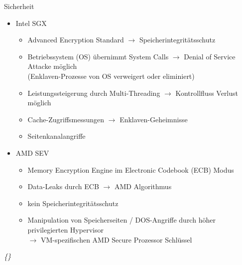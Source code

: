 \documentclass{sdqbeamer}
\begin{document}
\begin{frame}{Sicherheit}
	\begin{itemize}
		\item Intel SGX
		\begin{itemize}
			\item Advanced Encryption Standard
				\(\rightarrow\) Speicherintegritätsschutz
			\item Betriebssystem (OS) übernimmt System Calls
				\(\rightarrow\) Denial of Service Attacke möglich\\
				(Enklaven-Prozesse von OS verweigert oder eliminiert)
			\item Leistungssteigerung durch Multi-Threading
				\(\rightarrow\) Kontrollfluss Verlust möglich
			\item Cache-Zugriffsmessungen \(\rightarrow\) Enklaven-Geheimnisse
			\item Seitenkanalangriffe
		\end{itemize}
		\item AMD SEV
		\begin{itemize}
			\item Memory Encryption Engine im Electronic Codebook (ECB) Modus 
			\item Data-Leaks durch ECB \(\rightarrow\) AMD Algorithmus 
			\item kein Speicherintegritätsschutz
			\item Manipulation von Speicherseiten / DOS-Angriffe durch höher privilegierten Hypervisor\\
			\(\rightarrow\) VM-spezifischen AMD Secure Prozessor Schlüssel
		\end{itemize}
	\end{itemize}
	\vfill
	\small\textit{\{\cite{mofrad}\}}
\end{frame}
\end{document}
